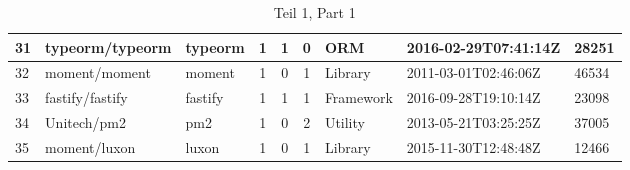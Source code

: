 \begin{landscape}
\begin{table}[h]
{\begin{tabular}{lllccclll}
                31 & typeorm/typeorm           & typeorm               & 1                      & 1                 & 0                 & ORM               & 2016-02-29T07:41:14Z & 28251          \\ \hline
                32 & moment/moment             & moment                & 1                      & 0                 & 1                 & Library           & 2011-03-01T02:46:06Z & 46534          \\ \hline
                33 & fastify/fastify           & fastify               & 1                      & 1                 & 1                 & Framework         & 2016-09-28T19:10:14Z & 23098          \\ \hline
                34 & Unitech/pm2               & pm2                   & 1                      & 0                 & 2                 & Utility           & 2013-05-21T03:25:25Z & 37005          \\ \hline
                35 & moment/luxon              & luxon                 & 1                      & 0                 & 1                 & Library           & 2015-11-30T12:48:48Z & 12466
            \end{tabular}%
        }
        \caption*{Teil 1, Part 1}
    \end{table}
\end{landscape}






